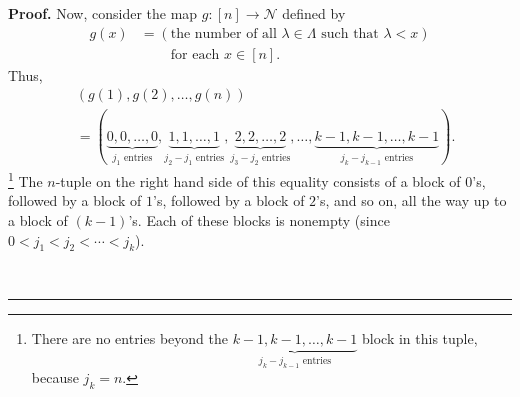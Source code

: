 \documentclass[numbers=enddot,12pt,final,onecolumn,notitlepage]{scrartcl}%
\theoremstyle{definition}
\newenvironment{proof}[1][Proof]{\noindent\textbf{#1.} }{\ \rule{0.5em}{0.5em}}
\newenvironment{verlong}{}{}
\begin{document}
\begin{verlong}
\begin{proof}
Now, consider the map $g:\left[  n\right]  \rightarrow\mathcal{N}$ defined by%
\begin{align*}
g\left(  x\right)   &  =\left(  \text{the number of all }\lambda\in
\Lambda\text{ such that }\lambda<x\right) \\
&  \ \ \ \ \ \ \ \ \ \ \text{for each }x\in\left[  n\right]  .
\end{align*}
Thus,%
\begin{align*}
&  \left(  g\left(  1\right)  ,g\left(  2\right)  ,\ldots,g\left(  n\right)
\right) \\
&  =\left(  \underbrace{0,0,\ldots,0}_{j_{1}\text{ entries}}%
,\underbrace{1,1,\ldots,1}_{j_{2}-j_{1}\text{ entries}},\underbrace{2,2,\ldots
,2}_{j_{3}-j_{2}\text{ entries}},\ldots,\underbrace{k-1,k-1,\ldots,k-1}%
_{j_{k}-j_{k-1}\text{ entries}}\right)  .
\end{align*}
\footnote{There are no entries beyond the $\underbrace{k-1,k-1,\ldots
,k-1}_{j_{k}-j_{k-1}\text{ entries}}$ block in this tuple, because $j_{k}=n$.}
The $n$-tuple on the right hand side of this equality consists of a block of
$0$'s, followed by a block of $1$'s, followed by a block of $2$'s, and so on,
all the way up to a block of $\left(  k-1\right)  $'s. Each of these blocks is
nonempty (since $0<j_{1}<j_{2}<\cdots<j_{k}$).


\end{proof}
\end{verlong}
\end{document}
